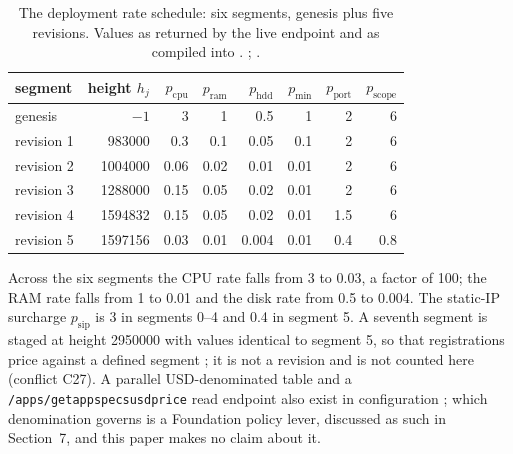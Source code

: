 \begin{table}[H]
\centering\small
\caption{The deployment rate schedule: six segments, genesis plus five revisions. Values as
returned by the live endpoint and as compiled into \FluxOS.
;
. \shipped}
\label{tab:pricetable}
\begin{tabular}{@{}lrrrrrrr@{}}
\toprule
segment & height $h_j$ & $p_{\mathrm{cpu}}$ & $p_{\mathrm{ram}}$ & $p_{\mathrm{hdd}}$ &
$p_{\min}$ & $p_{\mathrm{port}}$ & $p_{\mathrm{scope}}$ \\
\midrule
genesis     & $-1$              & 3    & 1    & 0.5   & 1    & 2   & 6   \\
revision 1  & \num{983000}      & 0.3  & 0.1  & 0.05  & 0.1  & 2   & 6   \\
revision 2  & \num{1004000}     & 0.06 & 0.02 & 0.01  & 0.01 & 2   & 6   \\
revision 3  & \num{1288000}     & 0.15 & 0.05 & 0.02  & 0.01 & 2   & 6   \\
revision 4  & \num{1594832}     & 0.15 & 0.05 & 0.02  & 0.01 & 1.5 & 6   \\
revision 5  & \num{1597156}     & 0.03 & 0.01 & 0.004 & 0.01 & 0.4 & 0.8 \\
\bottomrule
\end{tabular}
\end{table}

Across the six segments the CPU rate falls from 3 to 0.03, a factor of \num{100}; the RAM rate falls
from 1 to 0.01 and the disk rate from 0.5 to 0.004. The static-IP surcharge $p_{\mathrm{sip}}$ is 3
in segments 0--4 and 0.4 in segment 5. A seventh segment is staged at height \num{2950000} with
values identical to segment 5, so that  registrations price against a defined segment
; it is not a revision and is not counted here
(conflict C27). A parallel USD-denominated table and a \texttt{/\allowbreak{}apps/\allowbreak{}getappspecsusdprice} read
endpoint also exist in configuration ; which
denomination governs is a Foundation policy lever, discussed as such in Section~7, and this paper
makes no claim about it.

